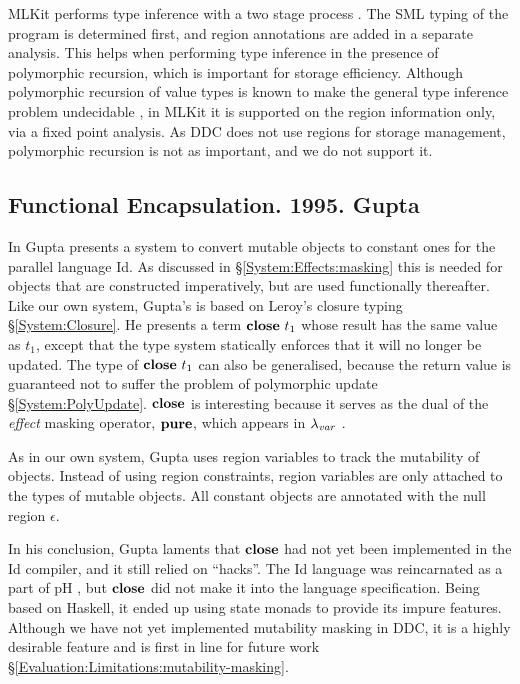 MLKit performs type inference with a two stage process \cite{tofte:region-inference}. The SML typing of the program is determined first, and region annotations are added in a separate analysis. This helps when performing type inference in the presence of polymorphic recursion, which is important for storage efficiency. Although polymorphic recursion of value types is known to make the general type inference problem undecidable \cite{mycroft:polymorphic-recursion}, in MLKit it is supported on the region information only, via a fixed point analysis. As DDC does not use regions for storage management, polymorphic recursion is not as important, and we do not support it.


\subsection{Functional Encapsulation. 1995. Gupta}
\label{System:Comparisons:functional-encapsulation}

In \cite{gupta:functional-encapsulation} Gupta presents a system to convert mutable objects to constant ones for the parallel language Id. As discussed in \S\ref{System:Effects:masking} this is needed for objects that are constructed imperatively, but are used functionally thereafter. Like our own system, Gupta's is based on Leroy's closure typing \S\ref{System:Closure}. He presents a term $\textrm{\textbf{close}} \ t_1$ whose result has the same value as $t_1$, except that the type system statically enforces that it will no longer be updated. The type of $\textrm{\textbf{close}} \ t_1$ can also be generalised, because the return value is guaranteed not to suffer the problem of polymorphic update \S\ref{System:PolyUpdate}. $\textrm{\textbf{close}}$ is interesting because it serves as the dual of the \emph{effect} masking operator, $\textrm{\textbf{pure}}$, which appears in $\lambda_{\operatorname{\mathit{var}}}$ \cite{odersky:lambda-var}.

As in our own system, Gupta uses region variables to track the mutability of objects. Instead of using region constraints, region variables are only attached to the types of mutable objects. All constant objects are annotated with the null region $\epsilon$. 

In his conclusion, Gupta laments that $\textrm{\textbf{close}}$ had not yet been implemented in the Id compiler, and it still relied on ``hacks''. The Id language was reincarnated as a part of pH \cite{nikhil:ph}, but $\textrm{\textbf{close}}$ did not make it into the language specification. Being based on Haskell, it ended up using state monads to provide its impure features. Although we have not yet implemented mutability masking in DDC, it is a highly desirable feature and is first in line for future work \S\ref{Evaluation:Limitations:mutability-masking}.


